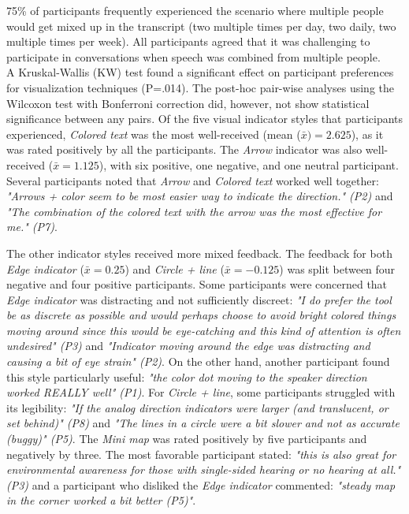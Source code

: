 75\% of participants frequently experienced the scenario where multiple people would get mixed up in the transcript (two multiple times per day, two daily, two multiple times per week). All participants agreed that it was challenging to participate in conversations when speech was combined from multiple people. 
\\

A Kruskal-Wallis (KW) test found a significant effect
on participant preferences for visualization techniques (P=.014).
The post-hoc pair-wise analyses using the Wilcoxon test with Bonferroni correction did, however, not show statistical significance between any pairs.
Of the five visual indicator styles that participants experienced, \emph{Colored text} was the most well-received (mean ($\bar{x})=2.625$), as it was rated positively by all the participants. %
The \emph{Arrow} indicator was also well-received ($\bar{x}=1.125$), with six positive, one negative, and one neutral participant.
Several participants noted that \emph{Arrow} and \emph{Colored text} worked well together: \emph{"Arrows + color seem to be most easier way to indicate the direction." (P2)} and \emph{"The combination of the colored text with the arrow was the most effective for me." (P7)}.

The other indicator styles received more mixed feedback. The feedback for both \emph{Edge indicator} ($\bar{x}=0.25$) and \emph{Circle + line} ($\bar{x}=-0.125$) was split between four negative and four positive participants. 
Some participants were concerned that \emph{Edge indicator} was distracting and not sufficiently discreet: \textit{"I do prefer the tool be as discrete as possible and would perhaps choose to avoid bright colored things moving around since this would be eye-catching and this kind of attention is often undesired" (P3)} and 
\textit{"Indicator moving around the edge was distracting and causing a bit of eye strain" (P2)}.
On the other hand, another participant found this style particularly useful: \textit{"the color dot moving to the speaker direction worked REALLY well" (P1)}. 
For \emph{Circle + line}, some participants struggled with its legibility: \textit{"If the analog direction indicators were larger (and translucent, or set behind)" (P8)} and \textit{"The lines in a circle were a bit slower and not as accurate (buggy)" (P5)}.
The \emph{Mini map} was rated positively by five participants and negatively by three. The most favorable participant stated: \emph{"this is also great for environmental awareness for those with single-sided hearing or no hearing at all." (P3)} and a participant who disliked the \emph{Edge indicator} commented: \emph{"steady map in the corner worked a bit better (P5)"}.

